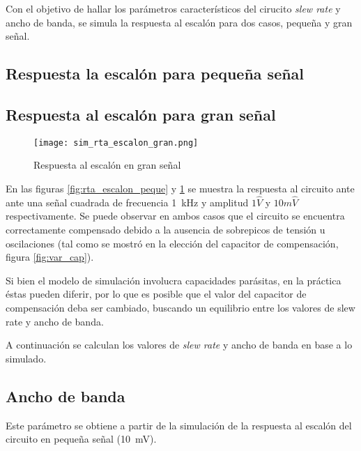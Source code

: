 	Con el objetivo de hallar los parámetros característicos del cirucito \textit{slew rate} y ancho de banda, se simula la respuesta al escalón para dos casos, pequeña y gran señal.

\subsection{Respuesta la escalón para pequeña señal}


\subsection{Respuesta al escalón para gran señal}

\begin{figure}[H]
	\centering
	\texttt{[image: sim\_rta\_escalon\_gran.png]}
	\caption{Respuesta al escalón en gran señal}
	\label{fig:rta_escalon_gran}
\end{figure}

	En las figuras \ref{fig:rta_escalon_peque} y \ref{fig:rta_escalon_gran} se muestra la respuesta al circuito ante ante una señal cuadrada de frecuencia \SI{1}{\kilo\hertz} y amplitud $1\hat{V}$ y $10m\hat{V}$ respectivamente. Se puede observar en ambos casos que el circuito se encuentra correctamente compensado debido a la ausencia de sobrepicos de tensión u oscilaciones (tal como se mostró en la elección del capacitor de compensación, figura \ref{fig:var_cap}). 
	
	Si bien el modelo de simulación involucra capacidades parásitas, en la práctica éstas pueden diferir, por lo que es posible que el valor del capacitor de compensación deba ser cambiado, buscando un equilibrio entre los valores de  slew rate y ancho de banda.
	
	A continuación se calculan los valores de \textit{slew rate} y ancho de banda en base a lo simulado.
\subsection{Ancho de banda}

	Este parámetro se obtiene a partir de la simulación de la respuesta al escalón del circuito en pequeña señal (\SI{10}{\milli\volt}).
	

